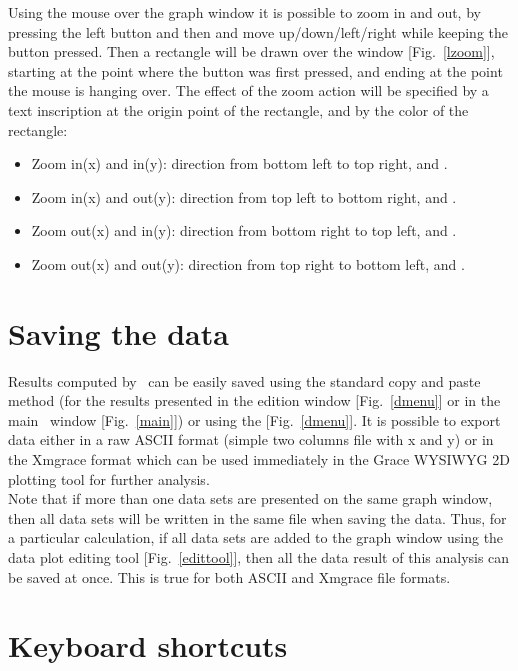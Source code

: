 Using the mouse over the graph window it is possible to zoom in and out, by pressing the left button and then and move up/down/left/right while keeping the button pressed. Then a rectangle will be drawn over the window [Fig.~\ref{lzoom}], starting at the point where the button was first pressed, and ending at the point the mouse is hanging over. The effect of the zoom action will be specified by a text inscription at the origin point of the rectangle, and by the color of the rectangle: 
\begin{itemize}
\item Zoom in(x) and in(y): direction from bottom left to top right, and .
\item Zoom in(x) and out(y): direction from top left to bottom right, and .
\item Zoom out(x) and in(y): direction from bottom right to top left, and .
\item Zoom out(x) and out(y): direction from top right to bottom left, and .
\end{itemize} 
\zoomfig

\clearpage

\section{Saving the data}

Results computed by \atomes\ can be easily saved using the standard copy and paste method (for the results presented in the edition window [Fig.~\ref{dmenu}] or in the main \atomes\ window [Fig.~\ref{main}]) 
or using the  [Fig.~\ref{dmenu}]. 
It is possible to export data either in a raw ASCII format (simple two columns file with x and y) or in the Xmgrace format which can be used immediately in the
Grace WYSIWYG 2D plotting tool \cite{XMGR} for further analysis. \\
Note that if more than one data sets are presented on the same graph window, then all data sets will be written in the same file when saving the data. 
Thus, for a particular calculation, if all data sets are added to the graph window using the data plot editing tool [Fig.~\ref{edittool}], 
then all the data result of this analysis can be saved at once. This is true for both ASCII and Xmgrace file formats.

\section{Keyboard shortcuts}

\kbdcurve
